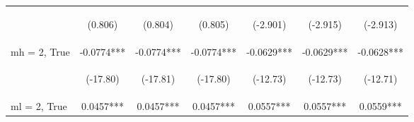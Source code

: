 \documentclass[]{article}
\begin{document}
\begin{center}
\begin{tabular}{lcccccc}
        \vspace{4pt}     & \begin{footnotesize}(0.806)\end{footnotesize}  & \begin{footnotesize}(0.804)\end{footnotesize}  & \begin{footnotesize}(0.805)\end{footnotesize}  & \begin{footnotesize}(-2.901)\end{footnotesize}  & \begin{footnotesize}(-2.915)\end{footnotesize} & \begin{footnotesize}(-2.913)\end{footnotesize} \\
        mh = 2, True     & -0.0774***                                     & -0.0774***                                     & -0.0774***                                     & -0.0629***                                      & -0.0629***                                     & -0.0628***                                     \\
        \vspace{4pt}     & \begin{footnotesize}(-17.80)\end{footnotesize} & \begin{footnotesize}(-17.81)\end{footnotesize} & \begin{footnotesize}(-17.80)\end{footnotesize} & \begin{footnotesize}(-12.73)\end{footnotesize}  & \begin{footnotesize}(-12.73)\end{footnotesize} & \begin{footnotesize}(-12.71)\end{footnotesize} \\
        ml = 2, True     & 0.0457***                                      & 0.0457***                                      & 0.0457***                                      & 0.0557***                                       & 0.0557***                                      & 0.0559***                                      \\

\end{tabular}
\end{center}
\end{document}
